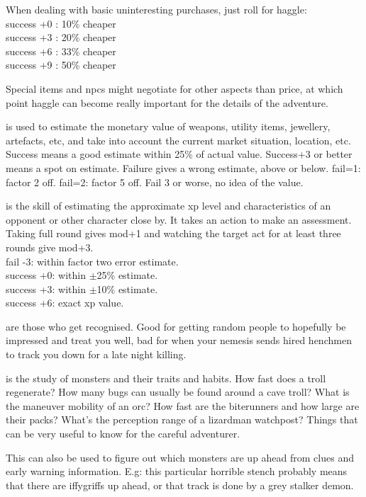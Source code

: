 When dealing with basic uninteresting purchases, just roll for haggle: \\
success +0 : 10\% cheaper \\
success +3 : 20\% cheaper \\
success +6 : 33\% cheaper \\
success +9 : 50\% cheaper

Special items and npcs might negotiate for other aspects than price, at which point haggle can become really important for the details of the adventure.


 is used to estimate the monetary value of weapons, utility items, jewellery, artefacts, etc, and take into account the current market situation, location, etc.
Success means a good estimate within 25\% of actual value. Success+3 or better means a spot on estimate. Failure gives a wrong estimate, above or below. fail=1: factor 2 off. fail=2: factor 5 off. Fail 3 or worse, no idea of the value.


 is the skill of estimating the approximate xp level and characteristics of an opponent or other character close by. It takes an action to make an assessment. Taking full round gives mod+1 and watching the target act for at least three rounds give mod+3. \\
fail -3: within factor two error estimate. \\
success +0: within $\pm$25\% estimate. \\
success +3: within $\pm$10\% estimate. \\
success +6: exact xp value.


 are those who get recognised. Good for getting random people to hopefully be impressed and treat you well, bad for when your nemesis sends hired henchmen to track you down for a late night killing.


 is the study of monsters and their traits and habits. How fast does a troll regenerate? How many bugs can usually be found around a cave troll? What is the maneuver mobility of an orc? How fast are the biterunners and how large are their packs? What's the perception range of a lizardman watchpost? Things that can be very useful to know for the careful adventurer.

This can also be used to figure out which monsters are up ahead from clues and early warning information. E.g: this particular horrible stench probably means that there are iffygriffs up ahead, or that track is done by a grey stalker demon.

